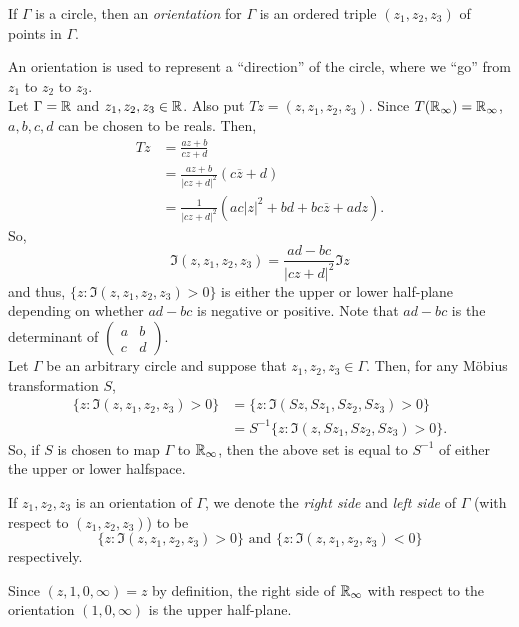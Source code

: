 	\begin{fdef}
		If $\Gamma$ is a circle, then an \emph{orientation} for $\Gamma$ is an ordered triple $(z_1,z_2,z_3)$ of points in $\Gamma$.
	\end{fdef}
	An orientation is used to represent a ``direction'' of the circle, where we ``go'' from $z_1$ to $z_2$ to $z_3$.\\

	Let $\Gamma = \mathbb{R}$ and $z_1,z_2,z_3 \in \mathbb{R}$. Also put $Tz = (z,z_1,z_2,z_3)$. Since $T(\mathbb{R}_\infty) = \mathbb{R}_\infty$, $a,b,c,d$ can be chosen to be reals. Then,
	\begin{align*}
		Tz &= \frac{az+b}{cz+d} \\
			&= \frac{az+b}{|cz+d|^2} (c\overline{z}+d) \\
			&= \frac{1}{|cz+d|^2} \left( ac |z|^2 + bd + bc\overline{z} + adz \right).
	\end{align*}
	So,
	\[ \Im(z,z_1,z_2,z_3) = \frac{ad-bc}{|cz+d|^2} \Im z \]
	and thus, $\{ z : \Im (z,z_1,z_2,z_3) > 0 \}$ is either the upper or lower half-plane depending on whether $ad-bc$ is negative or positive. Note that $ad-bc$ is the determinant of $\begin{pmatrix}a & b \\ c & d\end{pmatrix}$.\\

	Let $\Gamma$ be an arbitrary circle and suppose that $z_1,z_2,z_3 \in \Gamma$. Then, for any M\"{o}bius transformation $S$,
	\begin{align*}
		\{ z : \Im(z,z_1,z_2,z_3) > 0 \} &= \{ z : \Im(Sz,Sz_1,Sz_2,Sz_3) > 0 \} \\
			&= S^{-1} \{ z : \Im(z,Sz_1,Sz_2,Sz_3) > 0 \}.
	\end{align*}
	So, if $S$ is chosen to map $\Gamma$ to $\mathbb{R}_\infty$, then the above set is equal to $S^{-1}$ of either the upper or lower halfspace.\\

	\begin{definition}
		If $z_1,z_2,z_3$ is an orientation of $\Gamma$, we denote the \emph{right side} and \emph{left side} of $\Gamma$ (with respect to $(z_1,z_2,z_3)$) to be
		\[ \{ z : \Im(z,z_1,z_2,z_3) > 0 \} \text{ and } \{z : \Im(z,z_1,z_2,z_3) < 0\} \]
		respectively.
	\end{definition}

	Since $(z,1,0,\infty) = z$ by definition, the right side of $\mathbb{R}_\infty$ with respect to the orientation $(1,0,\infty)$ is the upper half-plane.

